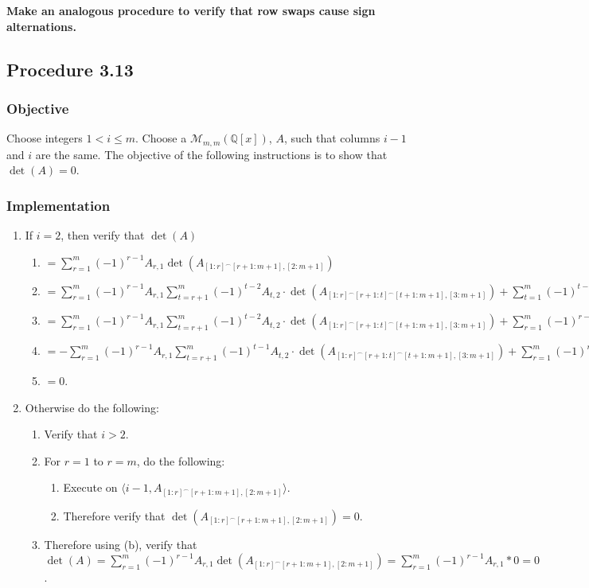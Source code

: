 \documentclass[twocolumn]{article}
\newcommand{\procedure}[2][]{\subsection*{Procedure #2 \ifthenelse{\equal{#1}{}}{}{(#1)}}\label{sec:procedure #2}}
\newcommand{\objective}{\subsubsection*{Objective}}
\newcommand{\implementation}{\subsubsection*{Implementation}}
\newcommand{\procedurehr}[2][]{\hyperref[sec:procedure #2]{\ifthenelse{\equal{#1}{}}{procedure #2}{#1}}}
\begin{document}
			\textbf{Make an analogous procedure to verify that row swaps cause sign alternations.}
		\procedure{3.13}
			\objective
				Choose integers $1<i\le m$. Choose a $\mathcal{M}_{m,m}(\mathbb{Q}[x])$, $A$, such that columns $i-1$ and $i$ are the same. The objective of the following instructions is to show that $\det(A)=0$.
			\implementation
				\begin{enumerate}
					\item If $i=2$, then verify that $\det(A)$
					\begin{enumerate}
						\item $=\sum_{r=1}^m (-1)^{r-1}A_{r,1}\det(A_{[1:r]^\frown[r+1:m+1],[2:m+1]})$
						\item $=\sum_{r=1}^m (-1)^{r-1}A_{r,1}\sum_{t=r+1}^m (-1)^{t-2}A_{t,2}\cdot\det(A_{[1:r]^\frown[r+1:t]^\frown[t+1:m+1],[3:m+1]})+\sum_{t=1}^m (-1)^{t-1}A_{t,1}\sum_{r=1}^{t-1} (-1)^{r-1}A_{r,2}\cdot\det(A_{[1:r]^\frown[r+1:t]^\frown[t+1:m+1],[3:m+1]})$
						\item $=\sum_{r=1}^m (-1)^{r-1}A_{r,1}\sum_{t=r+1}^m (-1)^{t-2}A_{t,2}\cdot\det(A_{[1:r]^\frown[r+1:t]^\frown[t+1:m+1],[3:m+1]})+\sum_{r=1}^m (-1)^{r-1}A_{r,2}\sum_{t=r+1}^m (-1)^{t-1}A_{t,1}\cdot\det(A_{[1:r]^\frown[r+1:t]^\frown[t+1:m+1],[3:m+1]})$
						\item $=-\sum_{r=1}^m (-1)^{r-1}A_{r,1}\sum_{t=r+1}^m (-1)^{t-1}A_{t,2}\cdot\det(A_{[1:r]^\frown[r+1:t]^\frown[t+1:m+1],[3:m+1]})+\sum_{r=1}^m (-1)^{r-1}A_{r,1}\sum_{t=r+1}^m (-1)^{t-1}A_{t,2}\cdot\det(A_{[1:r]^\frown[r+1:t]^\frown[t+1:m+1],[3:m+1]})$
						\item $=0$.
					\end{enumerate}
					\item Otherwise do the following:
					\begin{enumerate}
						\item Verify that $i>2$.
						\item For $r=1$ to $r=m$, do the following:
						\begin{enumerate}
							\item Execute \procedurehr{3.13} on $\langle i-1,\allowbreak A_{[1:r]^\frown[r+1:m+1],[2:m+1]}\rangle$.
							\item Therefore verify that $\det(A_{[1:r]^\frown[r+1:m+1],[2:m+1]})=0$.
						\end{enumerate}
						\item Therefore using (b), verify that $\det(A)=\sum_{r=1}^m (-1)^{r-1}A_{r,1}\det(A_{[1:r]^\frown[r+1:m+1],[2:m+1]})=\sum_{r=1}^m (-1)^{r-1}A_{r,1}*0=0$.
					\end{enumerate}
				\end{enumerate}
\end{document}
